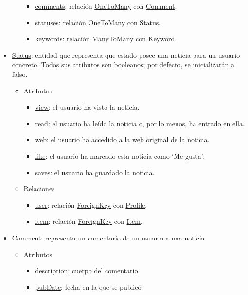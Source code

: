 \begin{itemize}
\begin{itemize}
\begin{itemize}
            \item \underline{comments}: relación \underline{OneToMany} con \underline{Comment}.
            \item \underline{statuses}: relación \underline{OneToMany} con \underline{Status}.
            \item \underline{keywords}: relación \underline{ManyToMany} con \underline{Keyword}.
        \end{itemize}
    \end{itemize}
    \item \underline{Status}: entidad que representa que estado posee una noticia para un usuario concreto. Todos sus atributos son booleanos; por defecto, se inicializarán a falso.
    \begin{itemize}
        \item Atributos
        \begin{itemize}
            \item \underline{view}: el usuario ha visto la noticia.
            \item \underline{read}: el usuario ha leído la noticia o, por lo menos, ha entrado en ella.
            \item \underline{web}: el usuario ha accedido a la web original de la noticia.
            \item \underline{like}: el usuario ha marcado esta noticia como ‘Me gusta’.
            \item \underline{saves}: el usuario ha guardado la noticia.
        \end{itemize}
        \item Relaciones
        \begin{itemize}
            \item \underline{user}: relación \underline{ForeignKey} con \underline{Profile}.
            \item \underline{item}: relación \underline{ForeignKey} con \underline{Item}.
        \end{itemize}
    \end{itemize}
    \item \underline{Comment}: representa un comentario de un usuario a una noticia.
    \begin{itemize}
        \item Atributos
        \begin{itemize}
            \item \underline{description}: cuerpo del comentario.
            \item \underline{pubDate}: fecha en la que se publicó.

\end{itemize}
\end{itemize}
\end{itemize}

